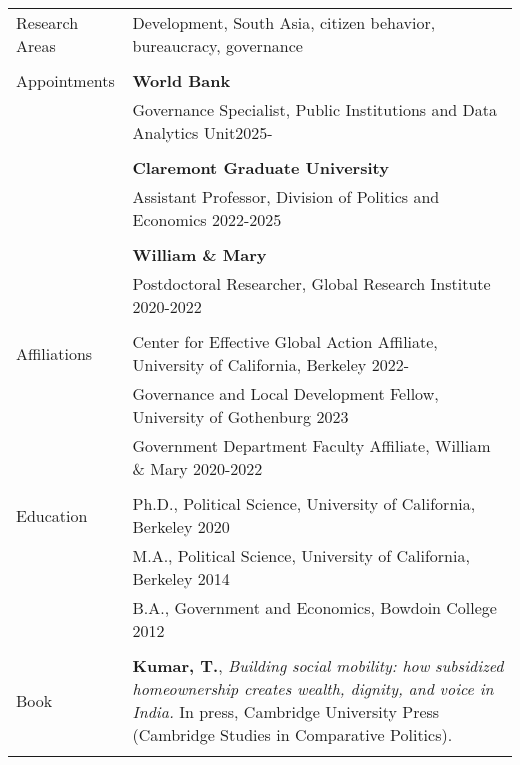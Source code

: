 \documentclass[letterpaper, 10.5pt]{article}
\begin{document}
\begin{longtable}{p{1.5in}p{5in}}

Research Areas & Development, South Asia,  citizen behavior, bureaucracy,  governance \\
& \\
Appointments 
& \textbf{World Bank} \hfill  \\
& Governance Specialist, Public Institutions and Data Analytics Unit\hfill  2025-\\& \\
& \textbf{Claremont Graduate University} \hfill  \\
& Assistant Professor, Division of Politics and Economics \hfill  2022-2025\\

& \\

& \textbf{William \& Mary} \hfill \\
& Postdoctoral Researcher, Global Research Institute \hfill 2020-2022 \\


& \\

Affiliations & Center for Effective Global Action Affiliate, University of California,  Berkeley \hfill 2022-\\ 
& Governance and Local Development Fellow, University of Gothenburg \hfill 2023\\


& Government Department Faculty Affiliate, William \& Mary \hfill 2020-2022  \\
& \\
{Education} 
&Ph.D., Political Science, University of California, Berkeley \hfill 2020 \\


& M.A., Political Science, University of California, Berkeley \hfill 2014 \\
& B.A., Government and Economics, Bowdoin College  \hfill 2012 \\

& \\

Book & \textbf{Kumar, T.},  \textit{Building social mobility: how subsidized homeownership creates wealth, dignity, and voice in India.} In press, Cambridge University Press (Cambridge Studies in Comparative Politics).\\

& \\


\end{longtable}
\end{document}
